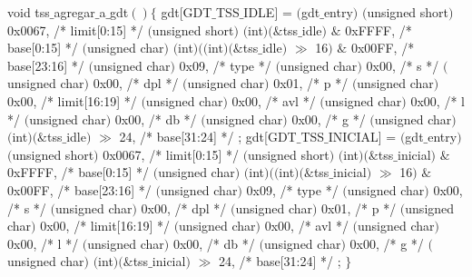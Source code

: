 \begin{algorithmic}
\State \tab  void tss$\_$agregar$\_$a$\_$gdt$() \{$
  \State \tab \tab gdt[GDT$\_$TSS$\_$IDLE] = $($gdt$\_$entry$)$ {
      \State \tab \tab \tab $($unsigned short$)$    0x0067,         /* limit[0:15]  */
      \State \tab \tab \tab $($unsigned short$)$    $($int$)$$($$\&$tss$\_$idle$)$ $\&$ 0xFFFF,         /* base[0:15]   */
      \State \tab \tab \tab $($unsigned char$)$     $($int$)$$($$($int$)$$($$\&$tss$\_$idle$)$ $\gg$ 16$)$ $\&$ 0x00FF,   /* base[23:16]  */
      \State \tab \tab \tab $($unsigned char$)$     0x09,           /* type         */
      \State \tab \tab \tab $($unsigned char$)$     0x00,           /* s            */
      \State \tab \tab \tab $($unsigned char$)$     0x00,           /* dpl          */
      \State \tab \tab \tab $($unsigned char$)$     0x01,           /* p            */
      \State \tab \tab \tab $($unsigned char$)$     0x00,           /* limit[16:19] */
      \State \tab \tab \tab $($unsigned char$)$     0x00,           /* avl          */
      \State \tab \tab \tab $($unsigned char$)$     0x00,           /* l            */
      \State \tab \tab \tab $($unsigned char$)$     0x00,           /* db           */
      \State \tab \tab \tab $($unsigned char$)$     0x00,           /* g            */
      \State \tab \tab \tab $($unsigned char$)$     $($int$)$$($$\&$tss$\_$idle$)$ $\gg$ 24,           /* base[31:24]  */
  \State \tab \tab };
  \State \tab \tab gdt[GDT$\_$TSS$\_$INICIAL] = $($gdt$\_$entry$)$ {
      \State \tab \tab \tab $($unsigned short$)$    0x0067,         /* limit[0:15]  */
      \State \tab \tab \tab $($unsigned short$)$    $($int$)$$($$\&$tss$\_$inicial$)$ $\&$ 0xFFFF, /* base[0:15]   */
      \State \tab \tab \tab $($unsigned char$)$     $($int$)$$($$($int$)$$($$\&$tss$\_$inicial$)$ $\gg$ 16$)$ $\&$ 0x00FF,           /* base[23:16]  */
      \State \tab \tab \tab $($unsigned char$)$     0x09,           /* type         */
      \State \tab \tab \tab $($unsigned char$)$     0x00,           /* s            */
      \State \tab \tab \tab $($unsigned char$)$     0x00,           /* dpl          */
      \State \tab \tab \tab $($unsigned char$)$     0x01,           /* p            */
      \State \tab \tab \tab $($unsigned char$)$     0x00,           /* limit[16:19] */
      \State \tab \tab \tab $($unsigned char$)$     0x00,           /* avl          */
      \State \tab \tab \tab $($unsigned char$)$     0x00,           /* l            */
      \State \tab \tab \tab $($unsigned char$)$     0x00,           /* db           */
      \State \tab \tab \tab $($unsigned char$)$     0x00,           /* g            */
      \State \tab \tab \tab $($unsigned char$)$     $($int$)$$($$\&$tss$\_$inicial$)$ $\gg$ 24,           /* base[31:24]  */
  \State \tab \tab };
\State \tab $\}$
\end{algorithmic}

